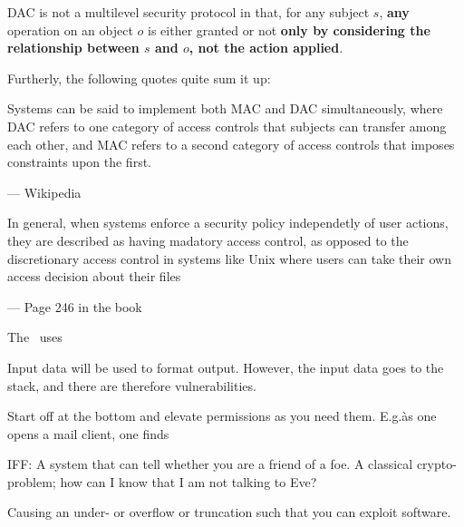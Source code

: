 \begin{definition}\label{diffDACMAC}
    DAC is not a multilevel security protocol in that, for any subject 
    $s$, \textbf{any} operation on an object $o$ is either granted or not 
    \textbf{only by considering the relationship between $s$ and $o$, not
    the action applied}.
    
    Furtherly, the following quotes quite sum it up:
        \epigraph{Systems can be said to implement both MAC and DAC simultaneously,
        where DAC refers to one category of access controls that subjects can 
        transfer among each other, and MAC refers to a second category of access 
        controls that imposes constraints upon the first.}{--- \textup{Wikipedia}}

        \epigraph{In general, when systems enforce a security policy independetly 
        of user actions, they are described as having madatory access control,
        as opposed to the discretionary access control in systems like Unix where 
        users can take their own access decision about their files}
        {--- \textup{Page 246 in the book}}
\end{definition}

\begin{definition}
The~ uses 
\end{definition}

\begin{definition}
    Input data will be used to format output. However, the input data
    goes to the stack, and there are therefore vulnerabilities.
\end{definition}

\begin{definition}
    Start off at the bottom and elevate permissions as you need them.
    E.g.\` as one opens a mail client, one finds 
\end{definition}

\begin{definition}{IFF:}\label{iff}
    A system that can tell whether you are a friend of a foe.
    A classical crypto-problem; how can I know that I am not talking to Eve?
\end{definition}

\begin{definition}
    Causing an under- or overflow or truncation such that you can 
    exploit software.
\end{definition}

